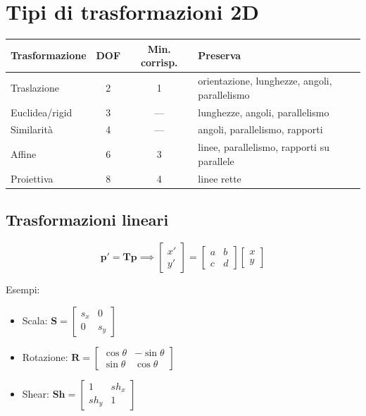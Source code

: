 \documentclass[12pt, a4paper]{report}
\begin{document}
\section{Tipi di trasformazioni 2D}

\begin{center}
\begin{tabular}{lccl}
\toprule
\textbf{Trasformazione}&\textbf{DOF}&\textbf{Min. corrisp.}&\textbf{Preserva}\\
\midrule
Traslazione    & 2 & 1 & orientazione, lunghezze, angoli, parallelismo\\
Euclidea/rigid & 3 & --- & lunghezze, angoli, parallelismo\\
Similarità     & 4 & --- & angoli, parallelismo, rapporti\\
Affine         & 6 & 3 & linee, parallelismo, rapporti su parallele\\
Proiettiva     & 8 & 4 & linee rette\\
\bottomrule
\end{tabular}
\end{center}

\subsection{Trasformazioni lineari}

\[
  \mathbf{p}'=\mathbf{T}\mathbf{p}\implies
  \begin{bmatrix}x'\\y'\end{bmatrix}=
  \begin{bmatrix}a&b\\c&d\end{bmatrix}\begin{bmatrix}x\\y\end{bmatrix}
\]

Esempi:
\begin{itemize}
  \item Scala: $\mathbf{S}=\begin{bmatrix}s_x&0\\0&s_y\end{bmatrix}$
  \item Rotazione: $\mathbf{R}=\begin{bmatrix}\cos\theta&-\sin\theta\\\sin\theta&\cos\theta\end{bmatrix}$
  \item Shear: $\mathbf{Sh}=\begin{bmatrix}1&sh_x\\sh_y&1\end{bmatrix}$
\end{itemize}
\end{document}
